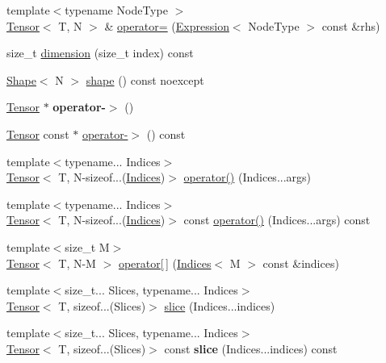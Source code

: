 \begin{DoxyCompactItemize}
{\footnotesize template$<$typename Node\+Type $>$ }\\\hyperlink{classtensor_1_1Tensor}{Tensor}$<$ T, N $>$ \& \hyperlink{classtensor_1_1Tensor_aa3cf0d0d3d23717cd09f5f5b3d96ab20}{operator=} (\hyperlink{structtensor_1_1Expression}{Expression}$<$ Node\+Type $>$ const \&rhs)
\item 
size\+\_\+t \hyperlink{classtensor_1_1Tensor_aa53f648dad035c24615bcda3247552e3}{dimension} (size\+\_\+t index) const 
\item 
\hyperlink{classtensor_1_1Shape}{Shape}$<$ N $>$ \hyperlink{classtensor_1_1Tensor_a27f61bd247cbcc9c3a62ca54fec494dd}{shape} () const noexcept
\item 
\hyperlink{classtensor_1_1Tensor}{Tensor} $\ast$ {\bfseries operator-\/$>$} ()\hypertarget{classtensor_1_1Tensor_a05b7c17ecf2eb27e8c7cab2233135a87}{}\label{classtensor_1_1Tensor_a05b7c17ecf2eb27e8c7cab2233135a87}

\item 
\hyperlink{classtensor_1_1Tensor}{Tensor} const $\ast$ \hyperlink{classtensor_1_1Tensor_af950c636c45895afa12718ce19ab50d8}{operator-\/$>$} () const 
\item 
{\footnotesize template$<$typename... Indices$>$ }\\\hyperlink{classtensor_1_1Tensor}{Tensor}$<$ T, N-\/sizeof...(\hyperlink{classtensor_1_1Indices}{Indices})$>$ \hyperlink{classtensor_1_1Tensor_a5f17aba14f92ac8bb7302f85bb90d830}{operator()} (Indices...\+args)
\item 
{\footnotesize template$<$typename... Indices$>$ }\\\hyperlink{classtensor_1_1Tensor}{Tensor}$<$ T, N-\/sizeof...(\hyperlink{classtensor_1_1Indices}{Indices})$>$ const \hyperlink{classtensor_1_1Tensor_a18bad684c8592a78571528d46c1a2f50}{operator()} (Indices...\+args) const 
\item 
{\footnotesize template$<$size\+\_\+t M$>$ }\\\hyperlink{classtensor_1_1Tensor}{Tensor}$<$ T, N-\/M $>$ \hyperlink{classtensor_1_1Tensor_ad29b57f798891b3feca9455e05d016af}{operator\mbox{[}$\,$\mbox{]}} (\hyperlink{classtensor_1_1Indices}{Indices}$<$ M $>$ const \&indices)
\item 
{\footnotesize template$<$size\+\_\+t... Slices, typename... Indices$>$ }\\\hyperlink{classtensor_1_1Tensor}{Tensor}$<$ T, sizeof...(Slices)$>$ \hyperlink{classtensor_1_1Tensor_a89e5758ea04096cc524b58184203f1a9}{slice} (Indices...\+indices)
\item 
{\footnotesize template$<$size\+\_\+t... Slices, typename... Indices$>$ }\\\hyperlink{classtensor_1_1Tensor}{Tensor}$<$ T, sizeof...(Slices)$>$ const {\bfseries slice} (Indices...\+indices) const \hypertarget{classtensor_1_1Tensor_a158c4b623ec2d154a873ca3353f1b7cb}{}\label{classtensor_1_1Tensor_a158c4b623ec2d154a873ca3353f1b7cb}


\end{DoxyCompactItemize}
